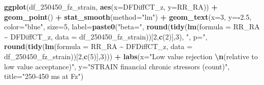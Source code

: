 \documentclass[
]{article}
\newenvironment{Shaded}{\begin{snugshade}}{\end{snugshade}}
\newcommand{\AttributeTok}[1]{\textcolor[rgb]{0.13,0.29,0.53}{#1}}
\newcommand{\DecValTok}[1]{\textcolor[rgb]{0.00,0.00,0.81}{#1}}
\newcommand{\FloatTok}[1]{\textcolor[rgb]{0.00,0.00,0.81}{#1}}
\newcommand{\FunctionTok}[1]{\textcolor[rgb]{0.13,0.29,0.53}{\textbf{#1}}}
\newcommand{\NormalTok}[1]{#1}
\newcommand{\SpecialCharTok}[1]{\textcolor[rgb]{0.81,0.36,0.00}{\textbf{#1}}}
\newcommand{\StringTok}[1]{\textcolor[rgb]{0.31,0.60,0.02}{#1}}
\begin{document}
\begin{Shaded}
\begin{Highlighting}[]
\FunctionTok{ggplot}\NormalTok{(df\_250450\_fz\_strain, }\FunctionTok{aes}\NormalTok{(}\AttributeTok{x=}\NormalTok{DFDiffCT\_z, }\AttributeTok{y=}\NormalTok{RR\_RA)) }\SpecialCharTok{+}
  \FunctionTok{geom\_point}\NormalTok{() }\SpecialCharTok{+}
  \FunctionTok{stat\_smooth}\NormalTok{(}\AttributeTok{method=}\StringTok{"lm"}\NormalTok{) }\SpecialCharTok{+}
  \FunctionTok{geom\_text}\NormalTok{(}\AttributeTok{x=}\DecValTok{3}\NormalTok{, }\AttributeTok{y=}\SpecialCharTok{{-}}\FloatTok{2.5}\NormalTok{, }\AttributeTok{color=}\StringTok{"blue"}\NormalTok{, }\AttributeTok{size=}\DecValTok{5}\NormalTok{, }\AttributeTok{label=}\FunctionTok{paste0}\NormalTok{(}\StringTok{"beta="}\NormalTok{,}
       \FunctionTok{round}\NormalTok{(}\FunctionTok{tidy}\NormalTok{(}\FunctionTok{lm}\NormalTok{(}\AttributeTok{formula =}\NormalTok{ RR\_RA }\SpecialCharTok{\textasciitilde{}}\NormalTok{ DFDiffCT\_z, }\AttributeTok{data =}\NormalTok{ df\_250450\_fz\_strain))[}\DecValTok{2}\NormalTok{,}\FunctionTok{c}\NormalTok{(}\DecValTok{2}\NormalTok{)],}\DecValTok{3}\NormalTok{),}
       \StringTok{", p="}\NormalTok{, }
       \FunctionTok{round}\NormalTok{(}\FunctionTok{tidy}\NormalTok{(}\FunctionTok{lm}\NormalTok{(}\AttributeTok{formula =}\NormalTok{ RR\_RA }\SpecialCharTok{\textasciitilde{}}\NormalTok{ DFDiffCT\_z, }\AttributeTok{data =}\NormalTok{ df\_250450\_fz\_strain))[}\DecValTok{2}\NormalTok{,}\FunctionTok{c}\NormalTok{(}\DecValTok{5}\NormalTok{)],}\DecValTok{3}\NormalTok{))) }\SpecialCharTok{+}
    \FunctionTok{labs}\NormalTok{(}\AttributeTok{x=}\StringTok{"Low value rejection }\SpecialCharTok{\textbackslash{}n}\StringTok{(relative to low value acceptance)"}\NormalTok{,}
       \AttributeTok{y=}\StringTok{"STRAIN financial chronic stressors (count)"}\NormalTok{,}
       \AttributeTok{title=}\StringTok{"250{-}450 ms at Fz"}\NormalTok{)}


\end{Highlighting}
\end{Shaded}
\end{document}
